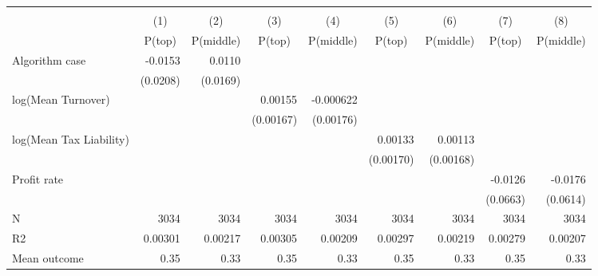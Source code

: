 \begin{tabular}{lrrrrrrrr} \hline \hline \\
                    &\multicolumn{1}{c}{(1)}&\multicolumn{1}{c}{(2)}&\multicolumn{1}{c}{(3)}&\multicolumn{1}{c}{(4)}&\multicolumn{1}{c}{(5)}&\multicolumn{1}{c}{(6)}&\multicolumn{1}{c}{(7)}&\multicolumn{1}{c}{(8)}\\
                    &\multicolumn{1}{c}{P(top)}&\multicolumn{1}{c}{P(middle)}&\multicolumn{1}{c}{P(top)}&\multicolumn{1}{c}{P(middle)}&\multicolumn{1}{c}{P(top)}&\multicolumn{1}{c}{P(middle)}&\multicolumn{1}{c}{P(top)}&\multicolumn{1}{c}{P(middle)}\\
\hline
Algorithm case      &     -0.0153         &      0.0110         &                     &                     &                     &                     &                     &                     \\
                    &    (0.0208)         &    (0.0169)         &                     &                     &                     &                     &                     &                     \\
[1em]
log(Mean Turnover)  &                     &                     &     0.00155         &   -0.000622         &                     &                     &                     &                     \\
                    &                     &                     &   (0.00167)         &   (0.00176)         &                     &                     &                     &                     \\
[1em]
log(Mean Tax Liability)&                     &                     &                     &                     &     0.00133         &     0.00113         &                     &                     \\
                    &                     &                     &                     &                     &   (0.00170)         &   (0.00168)         &                     &                     \\
[1em]
Profit rate         &                     &                     &                     &                     &                     &                     &     -0.0126         &     -0.0176         \\
                    &                     &                     &                     &                     &                     &                     &    (0.0663)         &    (0.0614)         \\
\hline
\hline N            &        3034         &        3034         &        3034         &        3034         &        3034         &        3034         &        3034         &        3034         \\
R2                  &     0.00301         &     0.00217         &     0.00305         &     0.00209         &     0.00297         &     0.00219         &     0.00279         &     0.00207         \\
Mean outcome        &        0.35         &        0.33         &        0.35         &        0.33         &        0.35         &        0.33         &        0.35         &        0.33         \\
\hline \end{tabular}
